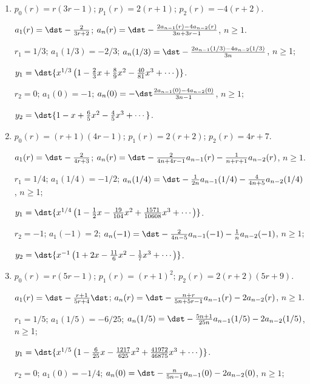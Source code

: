 \documentclass[openany]{book}
\newenvironment{sectionSolutions}{
 \begin{enumerate}[item-label={\thesection.\arabic{enumi}.}]
}{
 \end{enumerate}
}
\begin{document}
\begin{sectionSolutions}
\item
$p_0(r)=r(3r-1)$;
$p_1(r)=2(r+1)$;
$p_2(r)=-4(r+2)$.

$a_1(r)=\dst-\frac{2}{3r+2}$;
$a_n(r)=\dst-\frac{2a_{n-1}(r)-4a_{n-2}(r)}{3n+3r-1}$,
$n\ge1$.

$r_1=1/3$;
$a_1(1/3)=-2/3$;
$a_n(1/3)=\dst-\frac{2a_{n-1}(1/3)-4a_{n-2}(1/3)}{3n}$,
$n\ge$1;

$y_1=\dst{x^{1/3}\left(1-\frac{2}{3}x+\frac{8}{9}x^2-
\frac{40}{81}x^3+\cdots\right)}$.


$r_2=0$;
$a_1(0)=-1$;
$a_n(0)=-\dst\frac{2a_{n-1}(0)-4a_{n-2}(0)}{3n-1}$,
$n\ge1$;

$y_2=\dst{1-x+\frac{6}{5}x^2-\frac{4}{5}x^3+\cdots}$.




\item
$p_0(r)=(r+1)(4r-1)$;
$p_1(r)=2(r+2)$;
$p_2(r)=4r+7$.

$a_1(r)=\dst-\frac{2}{ 4r+3}$;
$a_n(r)=\dst-\frac{2}{ 4n+4r-1}a_{n-1}(r)-\frac{1}{ n+r+1}a_{n-2}(r)$,
$n\ge1$.

$r_1=1/4$;
$a_1(1/4)=-1/2$;
$a_n(1/4)=\dst-\frac{1}{ 2n}a_{n-1}(1/4)-\frac{4}{ 4n+5}a_{n-2}(1/4)$,
$n\ge$1;


$y_1=\dst{x^{1/4}\left(1-\frac{1}{2}x-\frac{19}{104}x^2+
\frac{1571}{10608}x^3+\cdots\right)}$.

$r_2=-1$;
$a_1(-1)=2$;
$a_n(-1)=\dst-\frac{2}{ 4n-5}a_{n-1}(-1)-\frac{1}{ n}a_{n-2}(-1)$,
$n\ge1$;

$y_2=\dst{x^{-1}\left(1+2x-\frac{11}{6}x^2-\frac{1}{7}x^3+\cdots\right)}$.


\item
$p_0(r)=r(5r-1)$;
$p_1(r)=(r+1)^2$;
$p_2(r)=2(r+2)(5r+9)$.


$a_1(r)=\dst-\frac{r+1}{5r+4}\dst$;
$a_n(r)=\dst-\frac{n+r}{5n+5r-1}a_{n-1}(r)-2a_{n-2}(r)$,
$n\ge1$.

$r_1=1/5$;
$a_1(1/5)=-6/25$;
$a_n(1/5)=\dst-\frac{5n+1}{25n}a_{n-1}(1/5)-2a_{n-2}(1/5)$,
$n\ge$1;

$y_1=\dst{x^{1/5}\left(1-\frac{6}{25}x-\frac{1217}{625}x^2+
\frac{41972}{46875}x^3
+\cdots\right)}$.


$r_2=0$;
$a_1(0)=-1/4$;
$a_n(0)=\dst-\frac{n}{5n-1}a_{n-1}(0)-2a_{n-2}(0)$,
$n\ge1$;


\end{sectionSolutions}
\end{document}
